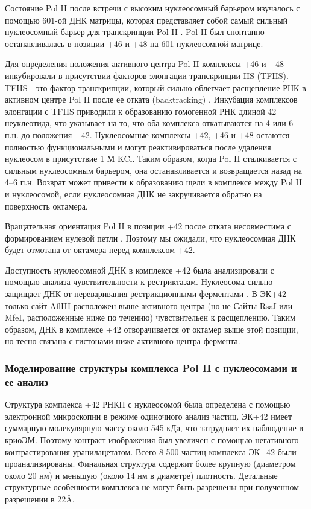     Состояние Pol II после встречи с высоким нуклеосомный барьером изучалось с помощью 601-ой ДНК матрицы, которая представляет собой самый сильный нуклеосомный барьер для транскрипции Pol II \cite{bondarenko_nucleosomes_2006}. Pol II был спонтанно останавливалась в позиции +46 и +48 на 601-нуклеосомной матрице.
    
    Для определения положения активного центра Pol II комплексы +46 и +48 инкубировали в присутствии факторов элонгации транскрипции IIS (TFIIS). TFIIS - это фактор транскрипции, который сильно облегчает расщепление РНК в активном центре Pol II после ее отката (backtracking) \cite{fish_promoting_2002}. Инкубация комплексов элонгации с TFIIS приводили к образованию гомогенной РНК длиной 42 неуклеотида, что указывает на то, что оба комплекса откатываются на 4 или 6 п.н. до положения +42. Нуклеосомные комплексы +42, +46 и +48 остаются полностью функциональными и могут реактивироваться после удаления нуклеосом в присутствие 1 М KCl. Таким образом, когда Pol II сталкивается с сильным нуклеосомным барьером, она останавливается и возвращается назад на 4–6 п.н. Возврат может привести к образованию щели в комплексе между Pol II и нуклеосомой, если нуклеосомная ДНК не закручивается обратно на поверхность октамера.
    
    Вращательная ориентация Pol II в позиции +42 после отката несовместима с формированием нулевой петли \cite{kulaeva_mechanism_2009}. Поэтому мы ожидали, что нуклеосомная ДНК будет отмотана от октамера перед комплексом +42.

    Доступность нуклеосомной ДНК в комплексе +42 была анализировали с помощью анализа чувствительности к рестриктазам. Нуклеосома сильно защищает ДНК от переваривания рестрикционными ферментами \cite{polach_restriction_1999}. В ЭК+42 только сайт AflIII расположен выше активного центра (но не Сайты RsaI или MfeI, расположенные ниже по течению) чувствительен к расщеплению. Таким образом, ДНК в комплексе +42 отворачивается от октамер выше этой позиции, но тесно связана с гистонами ниже активного центра фермента.
    
    \subsubsection{Моделирование структуры комплекса Pol II с нуклеосомами и ее анализ}
   Структура комплекса +42 РНКП с нуклеосомой была определена с помощью электронной микроскопии в режиме одиночного анализ частиц. ЭК+42 имеет суммарную молекулярную массу около 545 кДа, что затрудняет их наблюдение в криоЭМ. Поэтому контраст изображения был увеличен с помощью негативного контрастирования уранилацетатом. Всего 8 500 частиц комплекса ЭК+42 были проанализированы. Финальная структура содержит более крупную (диаметром около 20 нм) и меньшую (около 14 нм в диаметре) плотность. Детальные структурные особенности комплекса не могут быть разрешены при полученном разрешении в 22\AA. 
   
